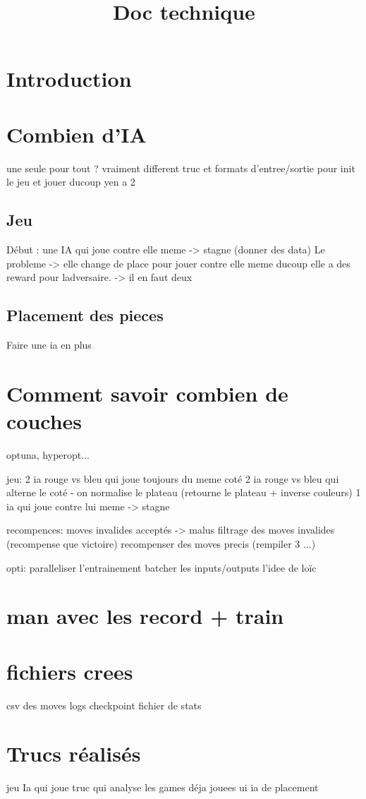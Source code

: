 \documentclass{article}
\title{Doc technique}
\begin{document}
\maketitle

\section{Introduction}


\section{Combien d'IA}
une seule pour tout ?
vraiment different truc et formats d'entree/sortie pour init le jeu et jouer ducoup yen a 2

\subsection{Jeu}
Début : une IA qui joue contre elle meme -> stagne (donner des data)
Le probleme -> elle change de place pour jouer contre elle meme ducoup elle a des reward pour ladversaire.
-> il en faut deux

\subsection{Placement des pieces}
Faire une ia en plus

\section{Comment savoir combien de couches}
optuna, hyperopt...

jeu:
2 ia rouge vs bleu qui joue toujours du meme coté
2 ia rouge vs bleu qui alterne le coté - on normalise le plateau (retourne le plateau + inverse couleurs)
1 ia qui joue contre lui meme -> stagne

recompences:
moves invalides acceptés -> malus
filtrage des moves invalides (recompense que victoire)
recompenser des moves precis (rempiler 3 ...)

opti:
paralleliser l'entrainement
batcher les inputs/outputs
l'idee de loïc

\section{man avec les record + train}

\section{fichiers crees}
csv des moves
logs
checkpoint
fichier de stats

\section{Trucs réalisés}
jeu
Ia qui joue
truc qui analyse les games déja jouees
ui
ia de placement
\end{document}
